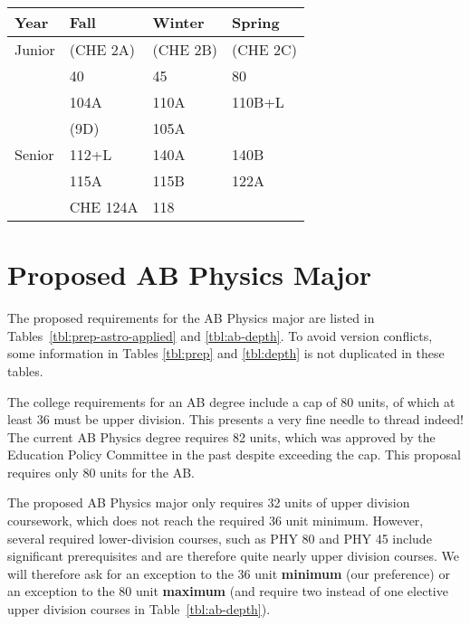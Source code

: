 \documentclass[12pt]{article}
\begin{document}
\newpage
{}
\vskip 0.25cm
\begin{center}
\begin{tabular}{|l|l|l|l|}
\hline
Year      & Fall    & Winter & Spring \\
\hline
Junior    & (CHE 2A)   & (CHE 2B)     & (CHE 2C) \\
          & 40         & 45           & 80 \\
          & 104A       & 110A         & 110B+L \\
          & (9D)       & 105A         & \\

\hline
Senior   & 112+L         & 140A       & 140B\\
         & 115A          & 115B       & 122A\\
         & CHE 124A      & 118       &  \\
\hline
\end{tabular}
\end{center}

\newpage
\section{Proposed AB Physics Major}
\label{sec:ab}

The proposed requirements for the AB Physics major are listed in
Tables~\ref{tbl:prep-astro-applied} and \ref{tbl:ab-depth}.  To avoid
version conflicts, some information in Tables \ref{tbl:prep} and
\ref{tbl:depth} is not duplicated in these tables.

The college requirements for an AB degree include a cap of 80
units, of which at least 36 must be upper division.  This presents a
very fine needle to thread indeed!  The current AB Physics degree
requires 82 units, which was approved by the Education Policy
Committee in the past despite exceeding the cap.  This proposal
requires only 80 units for the AB.

The proposed AB Physics major only requires 32 units of upper division coursework, which
does not reach the required 36 unit minimum.  However, several
required lower-division courses, such as PHY 80 and PHY 45 include
significant prerequisites and are therefore quite nearly upper
division courses.  We will therefore ask for an exception to the 36
unit {\bf minimum} (our preference) or an exception to the 80 unit
{\bf maximum} (and require two instead of one elective upper division
courses in Table~\ref{tbl:ab-depth}).
\end{document}
